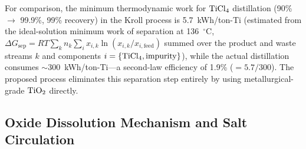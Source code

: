 \documentclass[sn-mathphys,Numbered]{sn-jnl}
\begin{document}
For comparison, the minimum thermodynamic work for $\ce{TiCl4}$ distillation (90\% $\to$ 99.9\%, 99\% recovery) in the Kroll process is 5.7~kWh/ton-Ti (estimated from the ideal-solution minimum work of separation at 136~$^{\circ}$C, $\Delta G_{\mathrm{sep}} = RT \sum_k n_k \sum_i x_{i,k}\ln(x_{i,k}/x_{i,\mathrm{feed}})$ summed over the product and waste streams $k$ and components $i = \{\ce{TiCl4}, \mathrm{impurity}\}$), while the actual distillation consumes $\sim$300~kWh/ton-Ti---a second-law efficiency of 1.9\% ($= 5.7/300$). The proposed process eliminates this separation step entirely by using metallurgical-grade $\ce{TiO2}$ directly.

\subsection{Oxide Dissolution Mechanism and Salt Circulation}
\label{subsec:dissolution}
\end{document}
